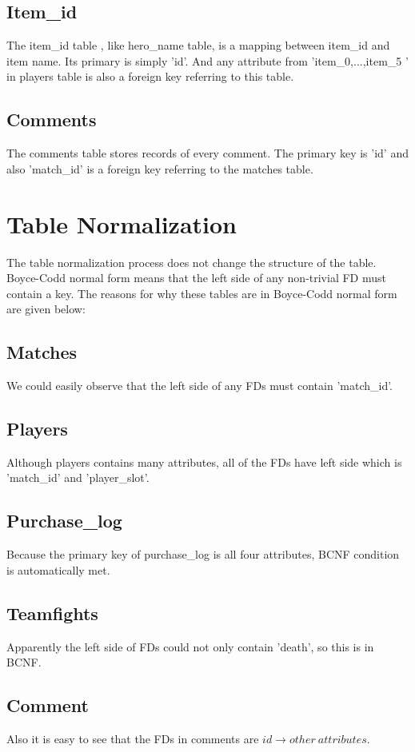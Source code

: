 \documentclass[a4paper]{article}
\begin{document}
\subsection{Item\_id}
The item\_id table , like hero\_name table, is a mapping between item\_id and item name. Its primary is simply 'id'. And any attribute from 'item\_0,...,item\_5 ' in players table is also a foreign key referring to this table.
\subsection{Comments}
The comments table stores records of every comment. The primary key is 'id' and also 'match\_id' is a foreign key referring to the matches table.

\section{Table Normalization}
The table normalization process does not change the structure of the table. Boyce-Codd normal form means that the left side of any non-trivial FD must contain a key. The reasons for why these tables are in Boyce-Codd normal form are given below:
\subsection{Matches}
We could easily observe that the left side of any FDs must contain 'match\_id'.

\subsection{Players}
Although players contains many attributes, all of the FDs have left side which is 'match\_id' and 'player\_slot'.
\subsection{Purchase\_log}
Because the primary key of purchase\_log is all four attributes, BCNF condition is automatically met.
\subsection{Teamfights}
Apparently the left side of FDs could not only contain 'death', so this is in BCNF.
\subsection{Comment}
Also it is easy to see that the FDs in comments are $id \rightarrow other\: attributes$.
\end{document}
